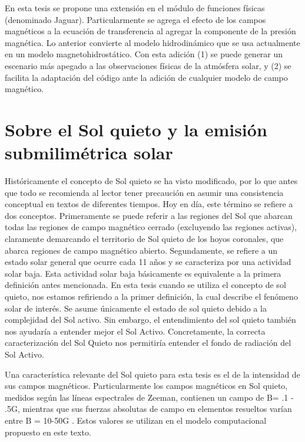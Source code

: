 En esta tesis se propone una extensi\'on en el m\'odulo de funciones f\'isicas (denominado Jaguar). Particularmente se agrega el efecto de los campos magn\'eticos a la ecuaci\'on de transferencia al agregar la componente de la presi\'on magn\'etica. Lo anterior convierte al modelo hidrodin\'amico que se usa actualmente en un modelo magnetohidrost\'atico. Con esta adici\'on (1) se puede generar un escenario m\'as apegado a las observaciones f\'isicas de la atm\'osfera solar, y (2) se facilita la adaptaci\'on del c\'odigo ante la adici\'on de cualquier modelo de campo magn\'etico.



\section{Sobre el Sol quieto y la emisi\'on submilim\'etrica solar}

Hist\'oricamente el concepto de Sol quieto se ha visto modificado, por lo que antes que todo se recomienda al lector tener precauci\'on en asumir una consistencia conceptual en textos de diferentes tiempos. Hoy en d\'ia, este t\'ermino se refiere a dos conceptos. Primeramente se puede referir a las regiones del Sol que abarcan todas las regiones de campo magn\'etico cerrado (excluyendo las regiones activas), claramente demarcando el territorio de Sol quieto de los hoyos coronales, que abarca regiones de campo magn\'etico abierto.
Segundamente, se refiere a un estado solar general que ocurre cada 11 a\~nos y se caracteriza por una actividad solar baja. Esta actividad solar baja b\'asicamente es equivalente a la primera definici\'on antes mencionada. En esta tesis cuando se utiliza el concepto de sol quieto, nos estamos refiriendo a la primer definici\'on, la cual describe el fen\'omeno solar de inter\'es. Se asume \'unicamente el estado de sol quieto debido a la complejidad del Sol activo. Sin embargo, el entendimiento del sol quieto tambi\'en nos ayudar\'ia a entender mejor el Sol Activo. Concretamente, la correcta caracterizaci\'on del Sol Quieto nos permitir\'ia entender el fondo de radiaci\'on del Sol Activo.

Una caracter\'istica relevante del Sol quieto para esta tesis es el de la intensidad de sus campos magn\'eticos. Particularmente los campos magn\'eticos en Sol quieto, medidos seg\'un las l\'ineas espectrales de Zeeman, contienen un campo de B= .1 - .5G, mientras que sus fuerzas absolutas de campo en elementos resueltos var\'ian entre B = 10-50G \citep{1000G}. Estos valores se utilizan en el modelo computacional propuesto en este texto.

